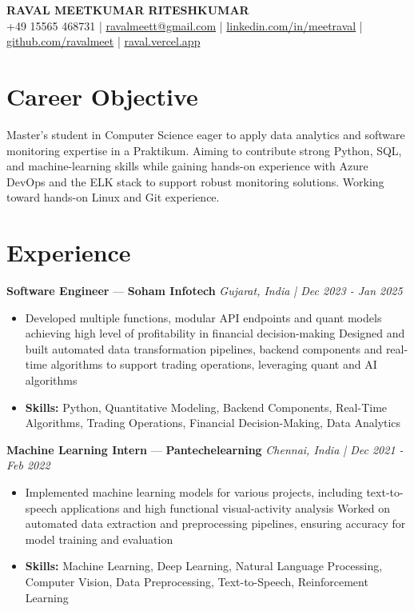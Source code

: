\documentclass[a4paper,10pt]{article}
\begin{document}
\begin{center}
  {\Large\bfseries RAVAL MEETKUMAR RITESHKUMAR}\\[2pt]
  {\small +49 15565 468731 \;|\; \href{mailto:ravalmeett@gmail.com}{ravalmeett@gmail.com} \;|\; \href{https://www.linkedin.com/in/meetraval/}{linkedin.com/in/meetraval} \;|\; \href{https://github.com/ravalmeet}{github.com/ravalmeet} \;|\; \href{https://raval.vercel.app/}{raval.vercel.app}}
\end{center}
\vspace{-3pt}

\section*{Career Objective}
Master's student in Computer Science eager to apply data analytics and software monitoring expertise in a Praktikum. Aiming to contribute strong Python, SQL, and machine-learning skills while gaining hands-on experience with Azure DevOps and the ELK stack to support robust monitoring solutions. Working toward hands-on Linux and Git experience.\par

\section*{Experience}
\textbf{Software Engineer} — \textbf{Soham Infotech} \hfill \textit{Gujarat, India \;|\; Dec 2023 - Jan 2025}\par
\vspace{1pt}
\begin{itemize}
  \item Developed multiple functions, modular API endpoints and quant models achieving high level of profitability in financial decision-making Designed and built automated data transformation pipelines, backend components and real-time algorithms to support trading operations, leveraging quant and AI algorithms
  \item \textbf{Skills:} Python, Quantitative Modeling, Backend Components, Real-Time Algorithms, Trading Operations, Financial Decision-Making, Data Analytics
\end{itemize}
\vspace{3pt}
\textbf{Machine Learning Intern} — \textbf{Pantechelearning} \hfill \textit{Chennai, India \;|\; Dec 2021 - Feb 2022}\par
\vspace{1pt}
\begin{itemize}
  \item Implemented machine learning models for various projects, including text-to-speech applications and high functional visual-activity analysis Worked on automated data extraction and preprocessing pipelines, ensuring accuracy for model training and evaluation
  \item \textbf{Skills:} Machine Learning, Deep Learning, Natural Language Processing, Computer Vision, Data Preprocessing, Text-to-Speech, Reinforcement Learning
\end{itemize}
\end{document}
